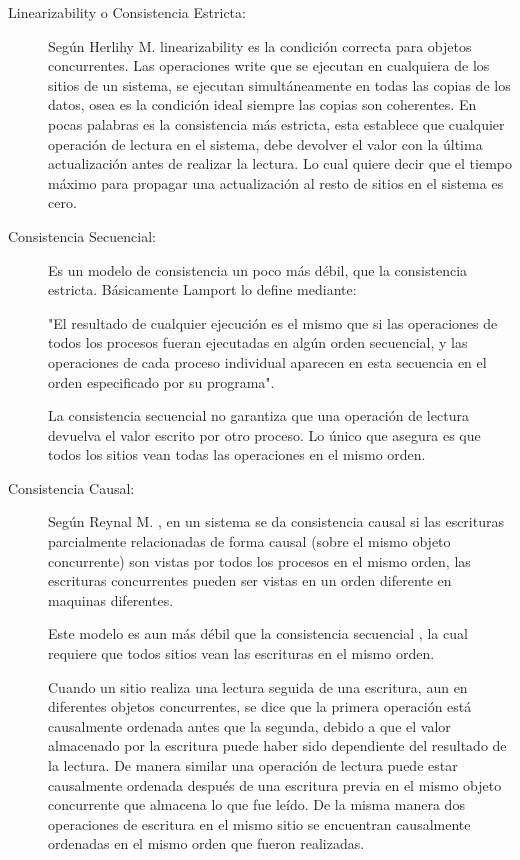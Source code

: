 \begin{description}

\item[Linearizability o Consistencia Estricta: ]
Según Herlihy M. \cite{herlihy} linearizability es la condición correcta para objetos concurrentes. Las operaciones write que se ejecutan en cualquiera de los sitios de un sistema, se ejecutan simultáneamente en todas las copias de los datos, osea es la condición ideal siempre las copias son coherentes. 
En pocas palabras es la consistencia más estricta, esta establece que cualquier operación de lectura en el sistema, debe devolver el valor con la última actualización antes de realizar la lectura. Lo cual quiere decir que el tiempo máximo para propagar una actualización al resto de sitios en el sistema es cero. 

\item[Consistencia Secuencial: ]
Es un modelo de consistencia un poco más débil, que la consistencia estricta. Básicamente Lamport \cite{lamport:1979} lo define mediante:

"El resultado de cualquier ejecución es el mismo que si las operaciones de todos los procesos fueran ejecutadas en algún orden secuencial, y las operaciones de cada proceso individual aparecen en esta secuencia en el orden especificado por su programa". 

La consistencia secuencial no garantiza que una operación de lectura devuelva el valor escrito por otro proceso. Lo único que asegura es que todos los sitios vean todas las operaciones en el mismo orden.

\item[Consistencia Causal: ]
Según Reynal M. \cite{raynal:1995}, en un sistema se da consistencia causal si las escrituras parcialmente relacionadas de forma causal (sobre el mismo objeto concurrente) son vistas por todos los procesos en el mismo orden, las escrituras concurrentes pueden ser vistas en un orden diferente en maquinas diferentes.

Este modelo es aun más débil que la consistencia secuencial \cite{ahamad:1991}, la cual requiere que todos sitios vean las escrituras en el mismo orden.

Cuando un sitio realiza una lectura seguida de una escritura, aun en diferentes objetos concurrentes, se dice que la primera operación está causalmente ordenada antes que la segunda, debido a que el valor almacenado por la escritura puede haber sido dependiente del resultado de la lectura. De manera similar una operación de lectura puede estar causalmente ordenada después de una escritura previa en el mismo objeto concurrente que almacena lo que fue leído. De la misma manera dos operaciones de escritura en el mismo sitio se encuentran causalmente ordenadas en el mismo orden que fueron realizadas. 


\end{description}
